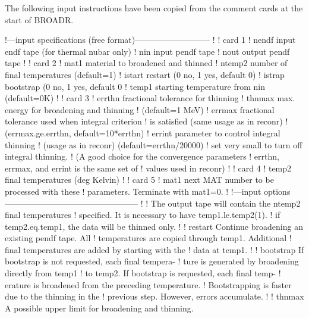 The following input instructions have been copied from the
comment cards at the start of BROADR.

\small
\begin{ccode}

   !---input specifications (free format)---------------------------
   !
   ! card 1
   !    nendf    input endf tape (for thermal nubar only)
   !    nin      input pendf tape
   !    nout     output pendf tape
   !
   ! card 2
   !    mat1     material to broadened and thinned
   !    ntemp2   number of final temperatures (default=1)
   !    istart   restart (0 no, 1 yes, default 0)
   !    istrap   bootstrap (0 no, 1 yes, default 0
   !    temp1    starting temperature from nin (default=0K)
   !
   ! card 3
   !    errthn   fractional tolerance for thinning
   !    thnmax   max. energy for broadening and thinning
   !             (default=1 MeV)
   !    errmax   fractional tolerance used when integral criterion
   !             is satisfied (same usage as in reconr)
   !             (errmax.ge.errthn, default=10*errthn)
   !    errint   parameter to control integral thinning
   !             (usage as in reconr) (default=errthn/20000)
   !             set very small to turn off integral thinning.
   !      (A good choice for the convergence parameters
   !       errthn, errmax, and errint is the same set of
   !       values used in reconr)
   !
   ! card 4
   !    temp2    final temperatures (deg Kelvin)
   !
   ! card 5
   !    mat1     next MAT number to be processed with these
   !             parameters.  Terminate with mat1=0.
   !
   !---input options------------------------------------------------
   !
   ! The output tape will contain the ntemp2 final temperatures
   ! specified.  It is necessary to have temp1.le.temp2(1).
   ! if temp2.eq.temp1, the data will be thinned only.
   !
   ! restart    Continue broadening an existing pendf tape.  All
   !            temperatures are copied through temp1.  Additional
   !            final temperatures are added by starting with the
   !            data at temp1.
   !
   ! bootstrap  If bootstrap is not requested, each final tempera-
   !            ture is generated by broadening directly from temp1
   !            to temp2.  If bootstrap is requested, each final temp-
   !            erature is broadened from the preceding temperature.
   !            Bootstrapping is faster due to the thinning in the
   !            previous step.  However, errors accumulate.
   !
   ! thnmax     A possible upper limit for broadening and thinning.

\end{ccode}
